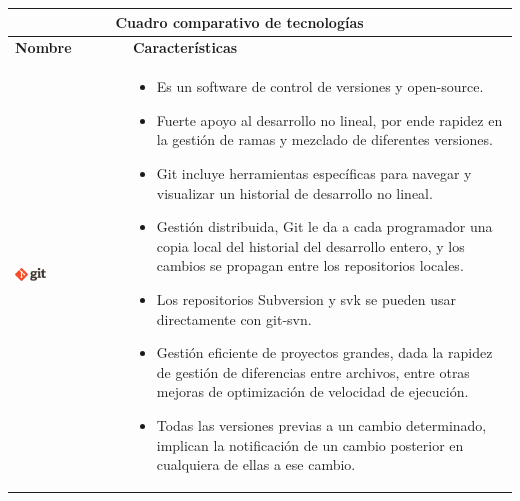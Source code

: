 \begin{table}[b!]
    \centering
    \vspace{-30mm}
      \begin{tabular}{|p{2cm}|ll}
        \hline
        
        \multicolumn{2}{|c|}{{\bf Cuadro comparativo de tecnologías}} \\ 
        \hline
          \multicolumn{1}{|p{4cm}|}{{\bf Nombre}} & 
		  \multicolumn{1}{p{10cm}|}{{\bf Características}}\\

        \hline
          \multicolumn{1}{|p{5cm}|}{\includegraphics[width=0.3\textwidth]{images/git}} & 
          \multicolumn{2}{p{10cm}|}{\begin{itemize}
          \vspace{-17mm}
        \item Es un software de control de versiones y open-source.
        \item Fuerte apoyo al desarrollo no lineal, por ende rapidez en la gestión de ramas y mezclado de diferentes versiones. 
        \item Git incluye herramientas específicas para navegar y visualizar un historial de desarrollo no lineal.
        \item Gestión distribuida, Git le da a cada programador una copia local del historial del desarrollo entero, y los cambios se propagan entre los repositorios locales.
         \item Los repositorios Subversion y svk se pueden usar directamente con git-svn.
        \item Gestión eficiente de proyectos grandes, dada la rapidez de gestión de diferencias entre archivos, entre otras mejoras de optimización de velocidad de ejecución.
        \item Todas las versiones previas a un cambio determinado, implican la notificación de un cambio posterior en cualquiera de ellas a ese cambio.\cite{38}
       
      \end{itemize}} \\
         

\end{tabular}
\end{table}
